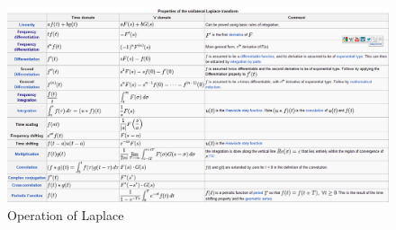 \documentclass[10pt,landscape]{article}
\theoremstyle{definition}
\theoremstyle{remark}
\begin{document}
\begin{figure}
    \centering
    \includegraphics[width=\textwidth,height=\textheight,keepaspectratio]{202/figure/lapace_table_2.png}
    \caption{Operation of Laplace \cite{oneill}}
    \label{fig:lapace_tb_2 }
\end{figure}
\end{document}
